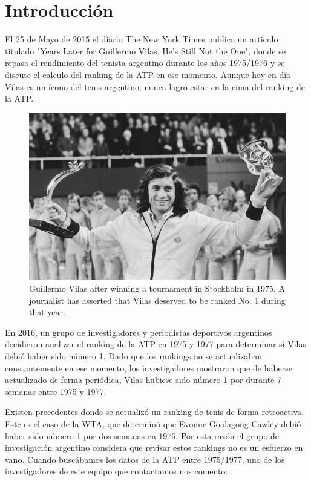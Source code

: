 \section{Introducción}

El 25 de Mayo de 2015 el diario The New York Times publico un articulo titulado "Years Later for Guillermo Vilas, He's Still Not the One", donde se repasa el rendimiento del tenista argentino durante los años 1975/1976 y se discute el calculo del ranking de la ATP en ese momento. Aunque hoy en día Vilas es un ícono del tenis argentino, nunca logró estar en la cima del ranking de la ATP.

\begin{figure}[H]
  \centering
  \includegraphics[scale=6]{images/nyt}
  \caption{Guillermo Vilas after winning a tournament in Stockholm in 1975. A journalist has asserted that Vilas deserved to be ranked No. 1 during that year. }
\end{figure}

En 2016, un grupo de investigadores y periodistas deportivos argentinos decidieron analizar el ranking de la ATP en 1975 y 1977 para determinar si Vilas debió haber sido número 1. Dado que los rankings no se actualizaban constantemente en ese momento, los investigadores mostraron que de haberse actualizado de forma periódica, Vilas hubiese sido número 1 por durante 7 semanas entre 1975 y 1977.

Existen precedentes donde se actualizó un ranking de tenis de forma retroactiva. Este es el caso de la WTA, que determinó que Evonne Goolagong Cawley debió haber sido número 1 por dos semanas en 1976. Por esta razón el grupo de investigación argentino considera que revisar estos rankings no es un esfuerzo en vano. Cuando buscábamos los datos de la ATP entre 1975/1977, uno de los investigadores de este equipo que contactamos nos comento: .

